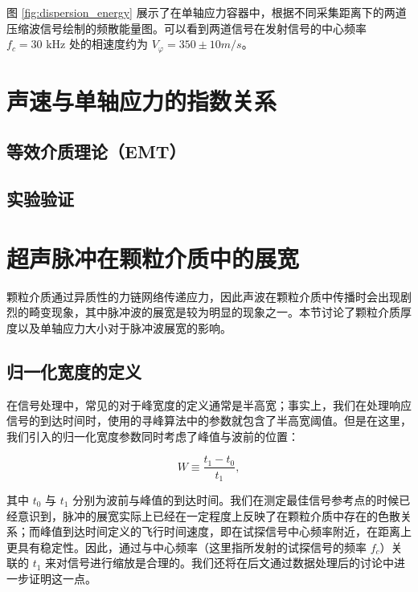 图 \ref{fig:dispersion_energy} 展示了在单轴应力容器中，根据不同采集距离下的两道压缩波信号绘制的频散能量图。可以看到两道信号在发射信号的中心频率 $f_{c} = 30\text{ kHz}$ 处的相速度约为 $V_{\varphi} = 350\pm 10\unit{m/s}$。

\section{声速与单轴应力的指数关系}

\subsection{等效介质理论（EMT）}


\subsection{实验验证}


\section{超声脉冲在颗粒介质中的展宽}

颗粒介质通过异质性的力链网络传递应力，因此声波在颗粒介质中传播时会出现剧烈的畸变现象，其中脉冲波的展宽是较为明显的现象之一。本节讨论了颗粒介质厚度以及单轴应力大小对于脉冲波展宽的影响。

\subsection{归一化宽度的定义}

在信号处理中，常见的对于峰宽度的定义通常是半高宽；事实上，我们在处理响应信号的到达时间时，使用的寻峰算法中的参数就包含了半高宽阈值。但是在这里，我们引入的归一化宽度参数同时考虑了峰值与波前的位置：

\begin{equation}
  W \equiv \frac{t_{1}-t_{0}}{t_{1}},
\end{equation}

其中 $t_{0}$ 与 $t_{1}$ 分别为波前与峰值的到达时间。我们在测定最佳信号参考点的时候已经意识到，脉冲的展宽实际上已经在一定程度上反映了在颗粒介质中存在的色散关系；而峰值到达时间定义的飞行时间速度，即在试探信号中心频率附近，在距离上更具有稳定性。因此，通过与中心频率（这里指所发射的试探信号的频率 $f_{c}$）关联的 $t_{1}$ 来对信号进行缩放是合理的。我们还将在后文通过数据处理后的讨论中进一步证明这一点。

